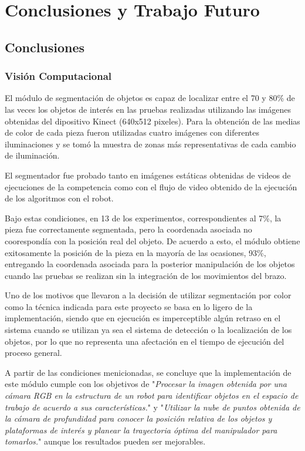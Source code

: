 \chapter{Conclusiones y Trabajo Futuro}
\section{Conclusiones}
\subsection{Visión Computacional}
El módulo de segmentación de objetos es capaz de localizar entre el 70 y 80\% de las veces los objetos de interés en las pruebas realizadas utilizando las imágenes obtenidas del dipositivo Kinect (640x512 pixeles). Para la obtención de las medias de color de cada pieza fueron utilizadas cuatro imágenes con diferentes iluminaciones y se tomó la muestra de zonas más representativas de cada cambio de iluminación.


El segmentador fue probado tanto en imágenes estáticas obtenidas de videos de ejecuciones de la competencia como con el flujo de video obtenido de la ejecución de los algoritmos con el robot.

Bajo estas condiciones, en 13 de los experimentos, correspondientes al 7\%, la pieza fue correctamente segmentada, pero la coordenada asociada no coorespondía con la posición real del objeto. De acuerdo a esto, el módulo obtiene exitosamente la posición de la pieza en la mayoría de las ocasiones, 93\%, entregando la coordenada asociada para la posterior manipulación de los objetos cuando las pruebas se realizan sin la integración de los movimientos del brazo.

Uno de los motivos que llevaron a la decisión de utilizar segmentación por color como la técnica indicada para este proyecto se basa en lo ligero de la implementación, siendo que en ejecución es imperceptible algún retraso en el sistema cuando se utilizan ya sea el sistema de detección o la localización de los objetos, por lo que no representa una afectación en el tiempo de ejecución del proceso general.\newpage

A partir de las condiciones menicionadas, se concluye que la implementación de este módulo cumple con los objetivos de "\textit{Procesar la imagen obtenida por una cámara RGB en la estructura de un robot para identificar objetos en el espacio de trabajo de acuerdo a sus características.}" y "\textit{Utilizar la nube de puntos  obtenida de la cámara de profundidad para conocer la posición relativa de los objetos y plataformas de interés y planear la trayectoria óptima del manipulador para tomarlos.}" aunque los resultados pueden ser mejorables.

